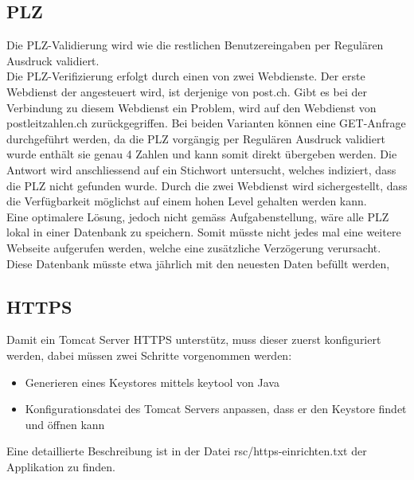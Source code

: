 \documentclass[12pt]{scrartcl}
\begin{document}
\subsection{PLZ}
Die PLZ-Validierung wird wie die restlichen Benutzereingaben per Regulären Ausdruck validiert.\\
Die PLZ-Verifizierung erfolgt durch einen von zwei Webdienste. Der erste Webdienst der angesteuert wird, ist derjenige von post.ch. Gibt es bei der Verbindung zu diesem Webdienst ein Problem, wird auf den Webdienst von postleitzahlen.ch zurückgegriffen. Bei beiden Varianten können eine GET-Anfrage durchgeführt werden, da die PLZ vorgängig per Regulären Ausdruck validiert wurde enthält sie genau 4 Zahlen und kann somit direkt übergeben werden. Die Antwort wird anschliessend auf ein Stichwort untersucht, welches indiziert, dass die PLZ nicht gefunden wurde. Durch die zwei Webdienst wird sichergestellt, dass die Verfügbarkeit möglichst auf einem hohen Level gehalten werden kann.\\
Eine optimalere Lösung, jedoch nicht gemäss Aufgabenstellung, wäre alle PLZ lokal in einer Datenbank zu speichern. Somit müsste nicht jedes mal eine weitere Webseite aufgerufen werden, welche eine zusätzliche Verzögerung verursacht. Diese Datenbank müsste etwa jährlich mit den neuesten Daten befüllt werden,

\subsection{HTTPS}
Damit ein Tomcat Server HTTPS unterstütz, muss dieser zuerst konfiguriert werden, dabei müssen zwei Schritte vorgenommen werden:
\begin{itemize}
	\item Generieren eines Keystores mittels keytool von Java
	\item Konfigurationsdatei des Tomcat Servers anpassen, dass er den Keystore findet und öffnen kann
\end{itemize}
Eine detaillierte Beschreibung ist in der Datei rsc/https-einrichten.txt der Applikation zu finden.
\end{document}
